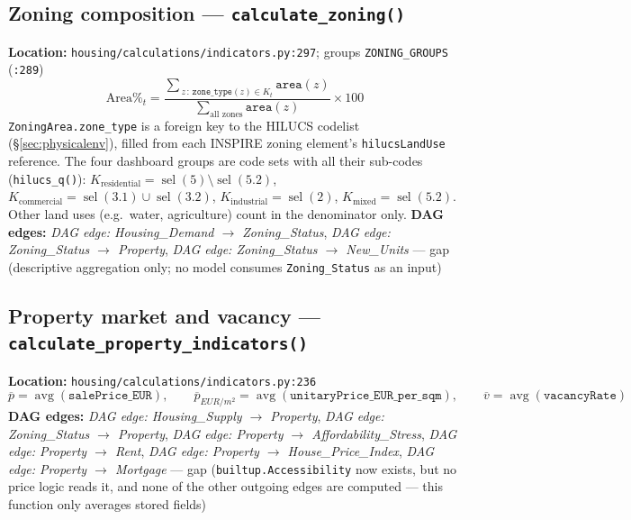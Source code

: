 \documentclass[11pt]{article}
\newcommand{\code}[1]{\texttt{#1}}
\newcommand{\dagedge}[1]{\textit{DAG edge: #1}}
\newcommand{\statusgap}{\textcolor{red!70!black}{gap}}
\begin{document}
\subsection{Zoning composition --- \code{calculate\_zoning()}}
\textbf{Location:} \code{housing/calculations/indicators.py:297}; groups \code{ZONING\_GROUPS} (\code{:289})
\begin{equation}
  \text{Area\%}_{t} = \frac{\sum_{\,z \,:\, \texttt{zone\_type}(z) \in K_t} \texttt{area}(z)}{\sum_{\text{all zones}} \texttt{area}(z)} \times 100
\end{equation}
\code{ZoningArea.zone\_type} is a foreign key to the HILUCS codelist (\S\ref{sec:physicalenv}), filled from each INSPIRE zoning element's \texttt{hilucsLandUse} reference. The four dashboard groups are code sets with all their sub-codes (\code{hilucs\_q()}): $K_{\text{residential}} = \operatorname{sel}(5) \setminus \operatorname{sel}(5.2)$, $K_{\text{commercial}} = \operatorname{sel}(3.1) \cup \operatorname{sel}(3.2)$, $K_{\text{industrial}} = \operatorname{sel}(2)$, $K_{\text{mixed}} = \operatorname{sel}(5.2)$. Other land uses (e.g.\ water, agriculture) count in the denominator only.
\textbf{DAG edges:} \dagedge{Housing\_Demand $\rightarrow$ Zoning\_Status}, \dagedge{Zoning\_Status $\rightarrow$ Property}, \dagedge{Zoning\_Status $\rightarrow$ New\_Units} --- \statusgap{} (descriptive aggregation only; no model consumes \code{Zoning\_Status} as an input)

\subsection{Property market and vacancy --- \code{calculate\_property\_indicators()}}
\textbf{Location:} \code{housing/calculations/indicators.py:236}
\begin{equation}
  \overline{p} = \operatorname{avg}(\texttt{salePrice\_EUR}), \qquad
  \overline{p}_{\si{EUR/m^2}} = \operatorname{avg}(\texttt{unitaryPrice\_EUR\_per\_sqm}), \qquad
  \overline{v} = \operatorname{avg}(\texttt{vacancyRate})
\end{equation}
\textbf{DAG edges:} \dagedge{Housing\_Supply $\rightarrow$ Property}, \dagedge{Zoning\_Status $\rightarrow$ Property}, \dagedge{Property $\rightarrow$ Affordability\_Stress}, \dagedge{Property $\rightarrow$ Rent}, \dagedge{Property $\rightarrow$ House\_Price\_Index}, \dagedge{Property $\rightarrow$ Mortgage} --- \statusgap{} (\code{builtup.Accessibility} now exists, but no price logic reads it, and none of the other outgoing edges are computed --- this function only averages stored fields)
\end{document}
